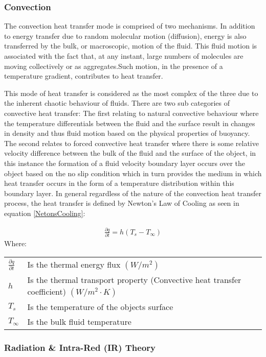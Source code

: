\documentclass[12pt]{article}
\newcommand{\ts}{\textsuperscript}
\newcommand{\pe}{\vspace{0.3cm}}
\newcommand{\mycite}[1]{\ts{\cite{#1}}}
\begin{document}
\subsubsection{Convection}
The convection heat transfer mode is comprised of two mechanisms. In addition to energy
transfer due to random molecular motion (diffusion), energy is also transferred by the bulk, or macroscopic, motion of the fluid. This fluid motion is associated with the fact that, at any instant, large numbers of molecules are moving collectively or as aggregates.Such motion, in the presence of a temperature gradient, contributes to heat transfer\mycite{bergman2011fundamentals}.  
\pe  

This mode of heat transfer is considered as the most complex of the three due to the inherent chaotic behaviour of fluids. There are two sub categories of convective heat transfer: The first relating to natural convective behaviour where the temperature differentials between the fluid and the surface result in changes in density and thus fluid motion based on the physical properties of buoyancy. The second relates to forced convective heat transfer where there is some relative velocity difference between the bulk of the fluid and the surface of the object, in this instance the formation of a fluid velocity boundary layer occurs over the object based on the no slip condition which in turn provides the medium in which heat transfer occurs in the form of a temperature distribution within this boundary layer. In general regardless of the nature of the convection heat transfer process, the heat transfer is defined by Newton's Law of Cooling as seen in equation \ref{NetonsCooling}: 

\begin{align} \label{NetonsCooling}
	\frac{\partial q}{\partial t} = h(T_s - T_\infty) 
\end{align}
Where: \\ 
\begin{tabular}{l | l}
	$\frac{\partial q}{\partial t}$ & Is the thermal energy flux $(W/m^2)$ \\ 
	$h$ & Is the thermal transport property (Convective heat transfer coefficient) $(W/m^2 \cdot K)$ \\ 
	$T_s$ & Is the temperature of the objects surface \\ 
	$T_\infty$ & Is the bulk fluid temperature \\   
\end{tabular}


\subsubsection{Radiation \& Intra-Red (IR) Theory}
\end{document}
